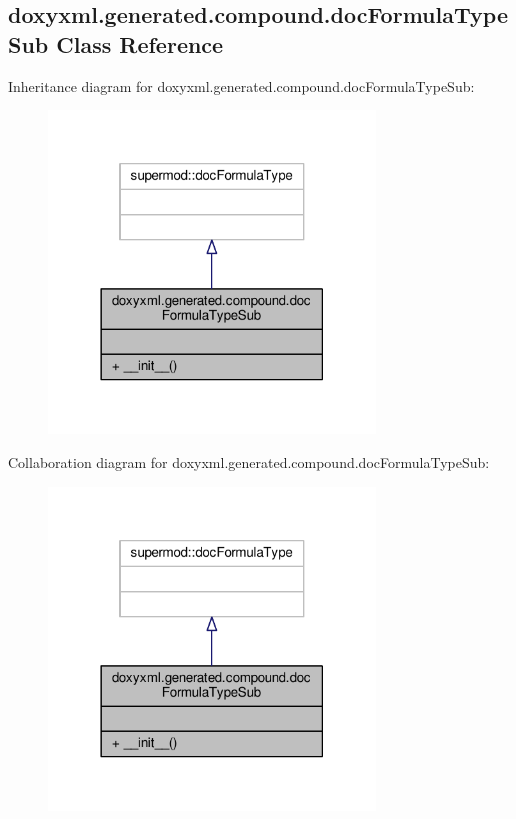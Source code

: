 \subsection{doxyxml.\+generated.\+compound.\+doc\+Formula\+Type\+Sub Class Reference}
\label{classdoxyxml_1_1generated_1_1compound_1_1docFormulaTypeSub}


Inheritance diagram for doxyxml.\+generated.\+compound.\+doc\+Formula\+Type\+Sub\+:
\nopagebreak
\begin{figure}[H]
\begin{center}
\leavevmode
\includegraphics[width=246pt]{d1/d17/classdoxyxml_1_1generated_1_1compound_1_1docFormulaTypeSub__inherit__graph}
\end{center}
\end{figure}


Collaboration diagram for doxyxml.\+generated.\+compound.\+doc\+Formula\+Type\+Sub\+:
\nopagebreak
\begin{figure}[H]
\begin{center}
\leavevmode
\includegraphics[width=246pt]{dd/dab/classdoxyxml_1_1generated_1_1compound_1_1docFormulaTypeSub__coll__graph}
\end{center}
\end{figure}
